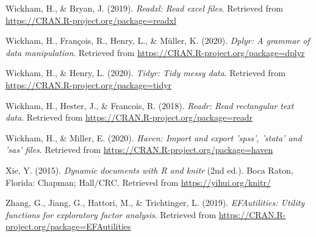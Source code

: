 \documentclass[
  english,
  man]{apa6}
\begin{document}
\leavevmode\hypertarget{ref-R-readxl}{}%
Wickham, H., \& Bryan, J. (2019). \emph{Readxl: Read excel files}. Retrieved from \url{https://CRAN.R-project.org/package=readxl}

\leavevmode\hypertarget{ref-R-dplyr}{}%
Wickham, H., François, R., Henry, L., \& Müller, K. (2020). \emph{Dplyr: A grammar of data manipulation}. Retrieved from \url{https://CRAN.R-project.org/package=dplyr}

\leavevmode\hypertarget{ref-R-tidyr}{}%
Wickham, H., \& Henry, L. (2020). \emph{Tidyr: Tidy messy data}. Retrieved from \url{https://CRAN.R-project.org/package=tidyr}

\leavevmode\hypertarget{ref-R-readr}{}%
Wickham, H., Hester, J., \& Francois, R. (2018). \emph{Readr: Read rectangular text data}. Retrieved from \url{https://CRAN.R-project.org/package=readr}

\leavevmode\hypertarget{ref-R-haven}{}%
Wickham, H., \& Miller, E. (2020). \emph{Haven: Import and export 'spss', 'stata' and 'sas' files}. Retrieved from \url{https://CRAN.R-project.org/package=haven}

\leavevmode\hypertarget{ref-R-knitr}{}%
Xie, Y. (2015). \emph{Dynamic documents with R and knitr} (2nd ed.). Boca Raton, Florida: Chapman; Hall/CRC. Retrieved from \url{https://yihui.org/knitr/}

\leavevmode\hypertarget{ref-R-EFAutilities}{}%
Zhang, G., Jiang, G., Hattori, M., \& Trichtinger, L. (2019). \emph{EFAutilities: Utility functions for exploratory factor analysis}. Retrieved from \url{https://CRAN.R-project.org/package=EFAutilities}

\endgroup
\end{document}
